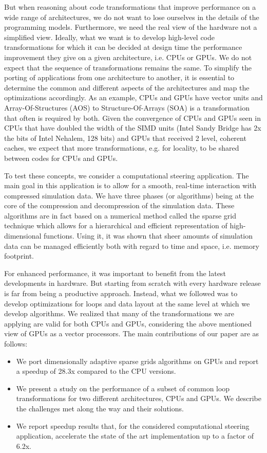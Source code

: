 But when reasoning about code transformations that improve performance on a wide
range of architectures, we do not want to lose ourselves in the details of the
programming models. Furthermore, we need the real view of the hardware not a
simplified view. Ideally, what we want is to develop high-level code
transformations for which it can be decided at design time the performance
improvement they give on a given architecture, i.e. CPUs or GPUs. We do not
expect that the sequence of transformations remains the same. To simplify the
porting of applications from one architecture to another, it is essential to
determine the common and different aspects of the architectures and map the
optimizations accordingly. As an example, CPUs and GPUs have vector units and
Array-Of-Structures (AOS) to Structure-Of-Arrays (SOA) is a transformation that
often is required by both. Given the convergence of CPUs and GPUs seen in CPUs
that have doubled the width of the SIMD units (Intel Sandy Bridge has 2x the
bits of Intel Nehalem, 128 bits) and GPUs that received 2 level, coherent
caches, we expect that more transformations, e.g. for locality, to be shared
between codes for CPUs and GPUs.

To test these concepts, we consider a computational steering application. The
main goal in this application is to allow for a smooth, real-time interaction
with compressed simulation data. We have three phases (or algorithms) being at the
core of the compression and decompression of the simulation data. These
algorithms are in fact based on a numerical method called the sparse grid
technique which allows for a hierarchical and efficient representation of
high-dimensional functions. Using it, it was shown that sheer amounts of
simulation data can be managed efficiently both with regard to time and space,
i.e. memory footprint.

For enhanced performance, it was important to benefit from the latest
developments in hardware. But starting from scratch with every hardware release
is far from being a productive approach. Instead, what we followed was to
develop optimizations for loops and data layout at the same level at which we
develop algorithms. We realized that many of the transformations we are applying
are valid for both CPUs and GPUs, considering the above mentioned view of GPUs
as a vector processors. The main contributions of our paper are as follows:

\begin{itemize}
  \item We port dimensionally adaptive sparse grids algorithms on GPUs and
  report a speedup of 28.3x compared to the CPU versions.
  \item We present a study on the performance of a subset of common loop
  transformations for two different architectures, CPUs and GPUs. We describe
  the challenges met along the way and their solutions.
  \item We report speedup results that, for the considered computational
  steering application, accelerate the state of the art implementation up to a
  factor of 6.2x.
\end{itemize}


